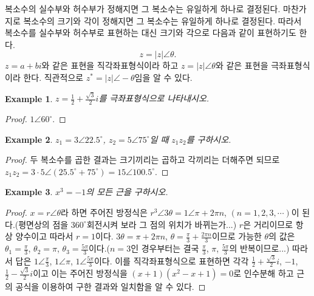 \documentclass[a4paper, nobookmarks, subfigure, adjustmath, amsmath]{oblivoir}
\newtheorem{example}{Example}
\begin{document}
복소수의 실수부와 허수부가 정해지면 그 복소수는 유일하게 하나로 결정된다. 마찬가지로 복소수의 크기와 각이 정해지면 그 복소수는 유일하게 하나로 결정된다. 따라서 복소수를 실수부와 허수부로 표현하는 대신 크기와 각으로 다음과 같이 표현하기도 한다.
\begin{equation}
z = |z|\angle \theta .
\end{equation}
$z = a+bi$와 같은 표현을 직각좌표형식이라 하고 $z = |z| \angle \theta$와 같은 표현을 극좌표형식이라 한다. 직관적으로 $z^{\ast} = |z|\angle-\theta$임을 알 수 있다.

\begin{example}
$z = \frac{1}{2} + \frac{\sqrt3}{2}i$를 극좌표형식으로 나타내시오.
\end{example}

\begin{proof}
$1 \angle 60^{\circ}$.
\end{proof}

\begin{example}
$z_1 = 3 \angle 22.5^{\circ}$, $z_2 = 5 \angle 75^{\circ}$일 때 $z_1 z_2$를 구하시오.
\end{example}

\begin{proof}
두 복소수를 곱한 결과는 크기끼리는 곱하고 각끼리는 더해주면 되므로 $z_1 z_2 = 3\cdot 5 \angle (25.5^{\circ}+75^{\circ}) = 15 \angle 100.5^{\circ}$.
\end{proof}

\begin{example}
$x^3 = -1$의 모든 근을 구하시오.
\end{example}

\begin{proof}
$x = r \angle \theta$라 하면 주어진 방정식은 $r^3 \angle 3\theta = 1 \angle \pi + 2\pi n$, $(n = 1,2,3,\cdots)$이 된다.(평면상의 점을 $360^{\circ}$회전시켜 보라 그 점의 위치가 바뀌는가...) $r$은 거리이므로 항상 양수이고 따라서 $r = 1$이다. $3\theta = \pi + 2\pi n$, $\theta = \frac{\pi}{3} + \frac{2\pi n}{3}$이므로 가능한 $\theta$의 값은 $\theta_1 = \frac{\pi}{3}$, $\theta_2 = \pi$, $\theta_3 = \frac{5\pi}{3}$이다.($n=3$인 경우부터는 결국 $\frac{\pi}{3}$, $\pi$, $\frac{5\pi}{3}$의 반복이므로...) 따라서 답은 $1 \angle \frac{\pi}{3}$, $1 \angle \pi$, $1 \angle \frac{5\pi}{3}$이다. 이를 직각좌표형식으로 표현하면 각각 $\frac{1}{2} + \frac{\sqrt3}{2}i$, $-1$, $\frac{1}{2} - \frac{\sqrt3}{2}i$이고 이는 주어진 방정식을 $(x+1)(x^2 - x + 1) = 0$로 인수분해 하고 근의 공식을 이용하여 구한 결과와 일치함을 알 수 있다.
\end{proof}
\end{document}
